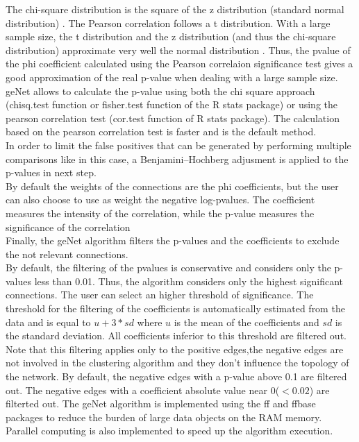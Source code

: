 \documentclass{article}
\begin{document}
The chi-square distribution is the square of the z distribution (standard normal distribution) \cite{Huzak2011}. The Pearson correlation follows a t distribution.  With a large sample size, the t distribution and the z distribution (and thus the chi-square distribution) approximate very well the normal distribution \cite{Hazra2016}. Thus, the pvalue of the phi coefficient calculated using the Pearson correlaion significance test gives a good approximation of the real p-value when dealing with a large sample size.\\
geNet allows to calculate the p-value using both the chi square approach (chisq.test function or fisher.test function of the R stats package) or using the pearson correlation test (cor.test function of R stats package). The calculation based on the pearson correlation test is faster and is the default method.\\
In order to limit the false positives that can be generated by performing multiple comparisons like in this case, a Benjamini–Hochberg adjusment is applied to the p-values in next step.\\
By default the weights of the connections are the phi coefficients, but the user can also choose to use as weight the negative log-pvalues. The coefficient measures the intensity of the correlation, while the p-value measures the significance of the correlation \\
Finally, the geNet algorithm filters the p-values and the coefficients to exclude the not relevant connections.\\
By default, the filtering of the pvalues is conservative and considers only the p-values less than 0.01. Thus, the algorithm considers only the highest significant connections. The user can select an higher threshold of significance. 
The threshold for the filtering of the coefficients is automatically estimated from the data and is equal to
$u + 3*sd$ where $u$ is the mean of the coefficients and $sd$ is the standard deviation. All coefficients inferior to this threshold are filtered out.\\
Note that this filtering applies only to the positive edges,the negative edges are not involved in the clustering algorithm and they don't influence the topology of the network. By default, the negative edges with a p-value above 0.1 are filtered out. The negative edges with a coefficient absolute value near 0($<0.02$) are filterted out.
The geNet algorithm is implemented using the ff and ffbase packages to reduce the burden of large data objects on the RAM memory. Parallel computing is also implemented to speed up the algorithm execution.\\
\end{document}
